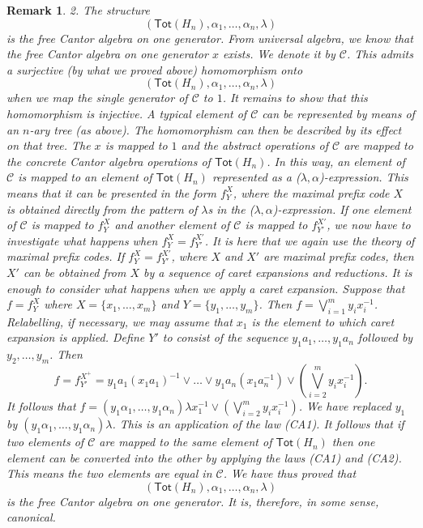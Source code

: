 \documentclass[a4paper]{amsart}
\newtheorem{remark}[theorem]{Remark}
\begin{document}
\begin{remark}
{2. {\em The structure
$$(\mathsf{Tot}(H_{n}), \alpha_{1}, \ldots, \alpha_{n}, \lambda)$$
is the free Cantor algebra on one generator.}
From universal algebra, we know that the free Cantor algebra on one generator $x$ exists.
We denote it by $\mathscr{C}$.
This admits a surjective (by what we proved above) homomorphism onto  
$$(\mathsf{Tot}(H_{n}), \alpha_{1}, \ldots, \alpha_{n}, \lambda)$$
when we map the single generator of $\mathscr{C}$ to $1$.
It remains to show that this homomorphism is injective.
A typical element of $\mathscr{C}$ can be represented by means of an $n$-ary tree (as above).
The homomorphism can then be described by its effect on that tree.
The $x$ is mapped to $1$ and the abstract operations of $\mathscr{C}$ are mapped
to the concrete Cantor algebra operations of $\mathsf{Tot}(H_{n})$. 
In this way, an element of $\mathscr{C}$ is mapped to an element of $\mathsf{Tot}(H_{n})$
represented as a ($\lambda,\alpha$)-expression.
This means that it can be presented in the form $f^{X}_{Y}$, where the maximal prefix code $X$
is obtained directly from the pattern of $\lambda$s in the ($\lambda,\alpha$)-expression.
If one element of $\mathscr{C}$ is mapped to $f^{X}_{Y}$ 
and another element of $\mathscr{C}$ is mapped to $f^{X'}_{Y'}$,
we now have to investigate what happens when $f^{X}_{Y} = f^{X'}_{Y'}$.
It is here that we again use the theory of maximal prefix codes.
If $f^{X}_{Y} = f^{X'}_{Y'}$, where $X$ and $X'$ are maximal prefix codes,
then $X'$ can be obtained from $X$ by a sequence of caret expansions and reductions.
It is enough to consider what happens when we apply a caret expansion.
Suppose that $f = f^{X}_{Y}$ where $X = \{x_{1}, \ldots, x_{m}\}$ and $Y = \{y_{1}, \ldots, y_{m}\}$.
Then $f = \bigvee_{i=1}^{m}y_{i}x_{i}^{-1}$.
Relabelling, if necessary, we may assume that $x_{1}$ is the element to which caret expansion is applied.
Define $Y'$ to consist of the sequence $y_{1}a_{1}, \ldots, y_{1}a_{n}$ followed by $y_{2}, \ldots, y_{m}$.
Then 
$$f = f^{X^{+}}_{Y'} = y_{1}a_{1}(x_{1}a_{1})^{-1} \vee \ldots \vee y_{1}a_{n}(x_{1}a_{n}^{-1}) \vee \left( \bigvee_{i=2}^{m} y_{i}x_{i}^{-1} \right).$$
It follows that $f = (y_{1}\alpha_{1}, \ldots, y_{1}\alpha_{n})\lambda x_{1}^{-1} \vee \left( \bigvee_{i=2}^{m} y_{i}x_{i}^{-1} \right)$.
We have replaced $y_{1}$ by $(y_{1}\alpha_{1}, \ldots, y_{1}\alpha_{n})\lambda$.
This is an application of the law (CA1).
It follows that if two elements of $\mathscr{C}$ are mapped to the same element of $\mathsf{Tot}(H_{n})$
then one element can be converted into the other by applying the laws (CA1) and (CA2).
This means the two elements are equal in $\mathscr{C}$.
We have thus proved that 
$$(\mathsf{Tot}(H_{n}), \alpha_{1}, \ldots, \alpha_{n}, \lambda)$$
is the free Cantor algebra on one generator.
It is, therefore, in some sense, canonical.

}
\end{remark}
\end{document}
